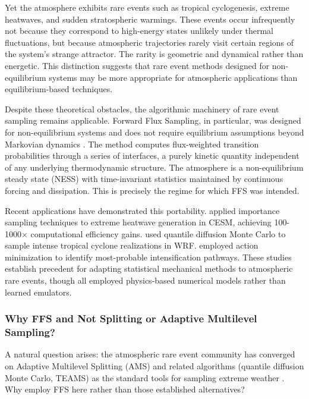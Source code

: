 \documentclass[11pt]{article}
\begin{document}
Yet the atmosphere exhibits rare events such as tropical cyclogenesis, extreme heatwaves, and sudden stratospheric warmings. These events occur infrequently not because they correspond to high-energy states unlikely under thermal fluctuations, but because atmospheric trajectories rarely visit certain regions of the system's strange attractor. The rarity is geometric and dynamical rather than energetic. This distinction suggests that rare event methods designed for non-equilibrium systems may be more appropriate for atmospheric applications than equilibrium-based techniques.

Despite these theoretical obstacles, the algorithmic machinery of rare event sampling remains applicable. Forward Flux Sampling, in particular, was designed for non-equilibrium systems and does not require equilibrium assumptions beyond Markovian dynamics \citep{allen2009forward}. The method computes flux-weighted transition probabilities through a series of interfaces, a purely kinetic quantity independent of any underlying thermodynamic structure. The atmosphere is a non-equilibrium steady state (NESS) with time-invariant statistics maintained by continuous forcing and dissipation. This is precisely the regime for which FFS was intended.

Recent applications have demonstrated this portability. \citet{ragone2018computation} applied importance sampling techniques to extreme heatwave generation in CESM, achieving 100-1000$\times$ computational efficiency gains. \citet{webber2019practical} used quantile diffusion Monte Carlo to sample intense tropical cyclone realizations in WRF. \citet{plotkin2019maximizing} employed action minimization to identify most-probable intensification pathways. These studies establish precedent for adapting statistical mechanical methods to atmospheric rare events, though all employed physics-based numerical models rather than learned emulators.

\subsubsection*{Why FFS and Not Splitting or Adaptive Multilevel Sampling?}

A natural question arises: the atmospheric rare event community has converged on Adaptive Multilevel Splitting (AMS) and related algorithms (quantile diffusion Monte Carlo, TEAMS) as the standard tools for sampling extreme weather \citep{ragone2018computation,webber2019practical}. Why employ FFS here rather than those established alternatives?
\end{document}

